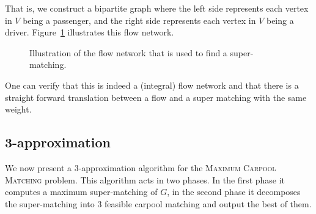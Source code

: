 \documentclass[]{llncs}
\def\CARPOOL{Maximum Carpool Ma\-tching}
\begin{document}
That is, 
we construct a bipartite graph where the left side represents each vertex 
in $V$ being a passenger,
and the right side represents each vertex in $V$ being a driver.
Figure~\ref{fig:cm-flow} illustrates this flow network.
%
\begin{figure}
\centering
{}
\caption{
\label{fig:cm-flow}
Illustration of the flow network that is used to find a super-matching.
}
\end{figure}
%
One can verify that this is indeed a (integral) flow network and that there is a
straight forward translation between a flow and a super matching with the same weight.
	\subsection{3-approximation}
We now present a 3-approximation algorithm for the \textsc{\CARPOOL{}} problem.
This algorithm acts in two phases.
In the first phase it computes a maximum super-matching of $G$, 
in the second phase it decomposes the super-matching into 3 feasible
carpool matching and output the best of them.
\end{document}
